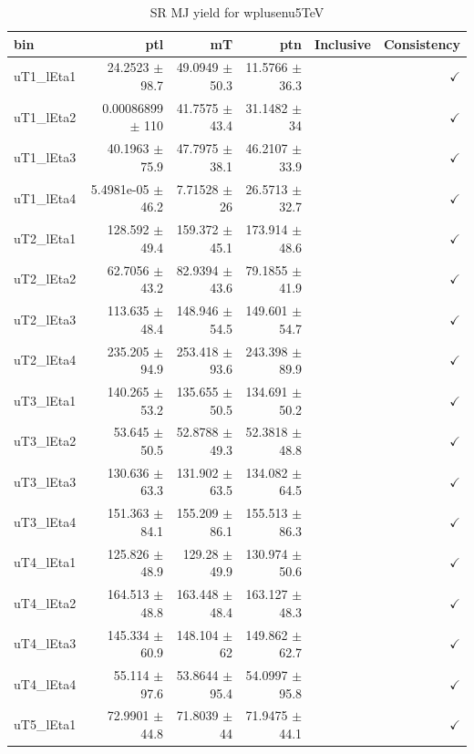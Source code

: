 \begin{table}[htbp]
\centering
\scriptsize
\caption{SR MJ yield for wplusenu5TeV}
\label{tab:wplusenu5TeV}
\setlength{\tabcolsep}{6pt}
\begin{tabular}{lrrrrr}
\hline
bin & ptl & mT & ptn & Inclusive & Consistency \\
\hline
uT1\_lEta1 & 24.2523 $\pm$ 98.7 & 49.0949 $\pm$ 50.3 & 11.5766 $\pm$ 36.3 &  & $\checkmark$ \\
uT1\_lEta2 & 0.00086899 $\pm$ 110 & 41.7575 $\pm$ 43.4 & 31.1482 $\pm$ 34 &  & $\checkmark$ \\
uT1\_lEta3 & 40.1963 $\pm$ 75.9 & 47.7975 $\pm$ 38.1 & 46.2107 $\pm$ 33.9 &  & $\checkmark$ \\
uT1\_lEta4 & 5.4981e-05 $\pm$ 46.2 & 7.71528 $\pm$ 26 & 26.5713 $\pm$ 32.7 &  & $\checkmark$ \\
uT2\_lEta1 & 128.592 $\pm$ 49.4 & 159.372 $\pm$ 45.1 & 173.914 $\pm$ 48.6 &  & $\checkmark$ \\
uT2\_lEta2 & 62.7056 $\pm$ 43.2 & 82.9394 $\pm$ 43.6 & 79.1855 $\pm$ 41.9 &  & $\checkmark$ \\
uT2\_lEta3 & 113.635 $\pm$ 48.4 & 148.946 $\pm$ 54.5 & 149.601 $\pm$ 54.7 &  & $\checkmark$ \\
uT2\_lEta4 & 235.205 $\pm$ 94.9 & 253.418 $\pm$ 93.6 & 243.398 $\pm$ 89.9 &  & $\checkmark$ \\
uT3\_lEta1 & 140.265 $\pm$ 53.2 & 135.655 $\pm$ 50.5 & 134.691 $\pm$ 50.2 &  & $\checkmark$ \\
uT3\_lEta2 & 53.645 $\pm$ 50.5 & 52.8788 $\pm$ 49.3 & 52.3818 $\pm$ 48.8 &  & $\checkmark$ \\
uT3\_lEta3 & 130.636 $\pm$ 63.3 & 131.902 $\pm$ 63.5 & 134.082 $\pm$ 64.5 &  & $\checkmark$ \\
uT3\_lEta4 & 151.363 $\pm$ 84.1 & 155.209 $\pm$ 86.1 & 155.513 $\pm$ 86.3 &  & $\checkmark$ \\
uT4\_lEta1 & 125.826 $\pm$ 48.9 & 129.28 $\pm$ 49.9 & 130.974 $\pm$ 50.6 &  & $\checkmark$ \\
uT4\_lEta2 & 164.513 $\pm$ 48.8 & 163.448 $\pm$ 48.4 & 163.127 $\pm$ 48.3 &  & $\checkmark$ \\
uT4\_lEta3 & 145.334 $\pm$ 60.9 & 148.104 $\pm$ 62 & 149.862 $\pm$ 62.7 &  & $\checkmark$ \\
uT4\_lEta4 & 55.114 $\pm$ 97.6 & 53.8644 $\pm$ 95.4 & 54.0997 $\pm$ 95.8 &  & $\checkmark$ \\
uT5\_lEta1 & 72.9901 $\pm$ 44.8 & 71.8039 $\pm$ 44 & 71.9475 $\pm$ 44.1 &  & $\checkmark$ \\

\end{tabular}
\end{table}
